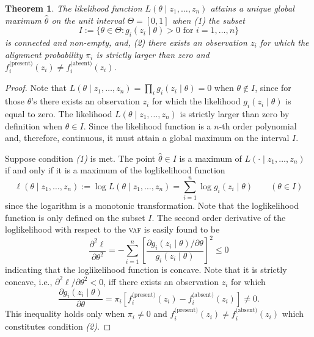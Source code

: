 \documentclass[12pt,a4paper]{article}
\numberwithin{equation}{section}
\newtheorem{theorem}{Theorem}
\begin{document}
\begin{theorem}
	The likelihood function $L(\theta \mid z_1, \dots, z_n)$ attains a unique global maximum $\widehat{\theta}$ on the unit interval $\Theta = [0,1]$ when (1) the subset 
	\begin{equation}
		I := \{\theta \in \Theta: g_i(z_i \mid \theta) > 0 \text{ for } i =1,\dots,n\}
	\end{equation}
	is connected and non-empty, and, (2) there exists an observation $z_i$ for which the alignment probability $\pi_i$ is strictly larger than zero and $f_i^{\text{(present)}}(z_i) \neq f_i^{\text{(absent)}}(z_i)$. 
\end{theorem}
\begin{proof}
Note that $L(\theta \mid z_1, \dots, z_n) = \prod_i g_i(z_i \mid \theta) = 0$ when $\theta \not\in I$, since for those $\theta$'s there exists an observation $z_i$ for which the likelihood $g_i(z_i \mid \theta)$ is equal to zero. The likelihood $L(\theta \mid z_1, \dots, z_n)$ is strictly larger than zero by definition when $\theta \in I$. Since the likelihood function is a $n$-th order polynomial and, therefore, continuous, it must attain a global maximum on the interval $I$. 

Suppose condition \emph{(1)} is met. The point $\widehat{\theta} \in I$ is a maximum of $L(\cdot \mid z_1, \dots, z_n)$ if and only if it is a maximum of the loglikelihood function 
\begin{equation}
	\ell(\theta \mid z_1, \dots, z_n) := \log L(\theta \mid z_1, \dots, z_n) = \sum_{i=1}^n \log g_i(z_i \mid \theta) \qquad (\theta \in I)
\end{equation}
since the logarithm is a monotonic transformation. Note that the loglikelihood function is only defined on the subset $I$. The second order derivative of the loglikelihood with respect to the \textsc{vaf} is easily found to be
\begin{equation}
	\frac{\partial^2 \ell}{\partial \theta^2} = - \sum_{i = 1}^n \left[\frac{\partial g_i(z_i \mid \theta) / \partial \theta}{g_i(z_i \mid \theta)} \right]^2 \leq 0
\end{equation}
 indicating that the loglikelihood function is concave. Note that it is strictly concave, i.e., $\partial^2 \ell / \partial \theta^2 < 0$, iff there exists an observation $z_i$ for which
\begin{equation}
	\frac{\partial g_i(z_i \mid \theta)}{\partial \theta} = \pi_i \left[f_i^{\text{(present)}}(z_i) - f_i^{\text{(absent)}}(z_i) \right] \neq 0.
\end{equation}
This inequality holds only when $\pi_i \neq 0$ and $f_i^{\text{(present)}}(z_i) \neq f_i^{\text{(absent)}}(z_i)$ which constitutes condition \emph{(2)}. 


\end{proof}
\end{document}
